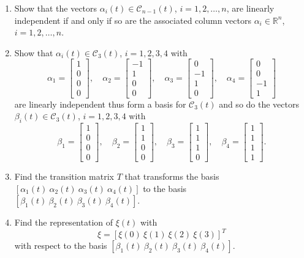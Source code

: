 \documentclass[UTF8,10pt,letterpaper,fontset=fandol]{ctexart}
\newcommand{\R}{\mathbb R}
\begin{document}
\begin{enumerate}
\item Show that the vectors \(\alpha_i(t)\in\mathcal C_{n-1}(t)\),
\(i=1,2,\ldots,n\), are linearly independent if and only if so are the
associated column vectors \(\alpha_i\in\R^n\), \(i=1,2,\ldots,n\).
\item Show that \(\alpha_i(t)\in\mathcal C_3(t)\), \(i=1,2,3,4\) with
\[
\alpha_1=\begin{bmatrix}1\\0\\0\\0\end{bmatrix},\quad
\alpha_2=\begin{bmatrix}-1\\1\\0\\0\end{bmatrix},\quad
\alpha_3=\begin{bmatrix}0\\-1\\1\\0\end{bmatrix},\quad
\alpha_4=\begin{bmatrix}0\\0\\-1\\1\end{bmatrix}
\]
are linearly independent thus form a basis for \(\mathcal C_3(t)\) and so do
the vectors \(\beta_i(t)\in\mathcal C_3(t)\), \(i=1,2,3,4\) with
\[
\beta_1=\begin{bmatrix}1\\0\\0\\0\end{bmatrix},\quad
\beta_2=\begin{bmatrix}1\\1\\0\\0\end{bmatrix},\quad
\beta_3=\begin{bmatrix}1\\1\\1\\0\end{bmatrix},\quad
\beta_4=\begin{bmatrix}1\\1\\1\\1\end{bmatrix}.
\]
\item Find the transition matrix \(T\) that transforms the basis
\([\alpha_1(t)\ \alpha_2(t)\ \alpha_3(t)\ \alpha_4(t)]\) to the basis
\([\beta_1(t)\ \beta_2(t)\ \beta_3(t)\ \beta_4(t)]\).
\item Find the representation of \(\xi(t)\) with
\[
\xi=[\xi(0)\ \xi(1)\ \xi(2)\ \xi(3)]^T
\]
with respect to the basis \([\beta_1(t)\ \beta_2(t)\ \beta_3(t)\ \beta_4(t)]\).
\end{enumerate}
\end{document}
